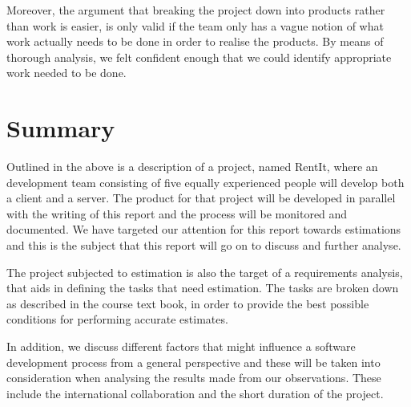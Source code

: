 Moreover, the argument that breaking the project down into products rather than work is easier, is only valid if the team only has a vague notion of what work actually needs to be done in order to realise the products. By means of thorough analysis, we felt confident enough that we could identify appropriate work needed to be done.


\section{Summary}
Outlined in the above is a description of a project, named RentIt, where an development team consisting of five equally experienced people will develop both a client and a server. The product for that project will be developed in parallel with the writing of this report and the process will be monitored and documented. We have targeted our attention for this report towards estimations and this is the subject that this report will go on to discuss and further analyse.

The project subjected to estimation is also the target of a requirements analysis, that aids in defining the tasks that need estimation. The tasks are broken down as described in the course text book, in order to provide the best possible conditions for performing accurate estimates.

In addition, we discuss different factors that might influence a software development process from a general perspective and these will be taken into consideration when analysing the results made from our observations. These include the international collaboration and the short duration of the project. \\


 



